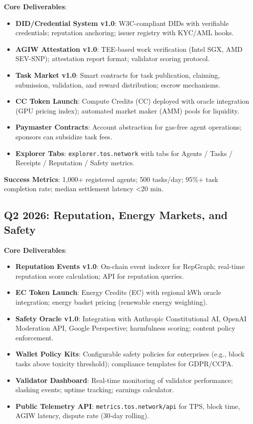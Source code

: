 \documentclass[11pt]{article}
\begin{document}
\textbf{Core Deliverables}:
\begin{itemize}[noitemsep]
  \item \textbf{DID/Credential System v1.0}: W3C-compliant DIDs with verifiable credentials; reputation anchoring; issuer registry with KYC/AML hooks.
  \item \textbf{AGIW Attestation v1.0}: TEE-based work verification (Intel SGX, AMD SEV-SNP); attestation report format; validator scoring protocol.
  \item \textbf{Task Market v1.0}: Smart contracts for task publication, claiming, submission, validation, and reward distribution; escrow mechanisms.
  \item \textbf{CC Token Launch}: Compute Credits (CC) deployed with oracle integration (GPU pricing index); automated market maker (AMM) pools for liquidity.
  \item \textbf{Paymaster Contracts}: Account abstraction for gas-free agent operations; sponsors can subsidize task fees.
  \item \textbf{Explorer Tabs}: \texttt{explorer.tos.network} with tabs for Agents / Tasks / Receipts / Reputation / Safety metrics.
\end{itemize}

\textbf{Success Metrics}: 1,000+ registered agents; 500 tasks/day; 95\%+ task completion rate; median settlement latency <20 min.

\subsection{Q2 2026: Reputation, Energy Markets, and Safety}

\textbf{Core Deliverables}:
\begin{itemize}[noitemsep]
  \item \textbf{Reputation Events v1.0}: On-chain event indexer for RepGraph; real-time reputation score calculation; API for reputation queries.
  \item \textbf{EC Token Launch}: Energy Credits (EC) with regional kWh oracle integration; energy basket pricing (renewable energy weighting).
  \item \textbf{Safety Oracle v1.0}: Integration with Anthropic Constitutional AI, OpenAI Moderation API, Google Perspective; harmfulness scoring; content policy enforcement.
  \item \textbf{Wallet Policy Kits}: Configurable safety policies for enterprises (e.g., block tasks above toxicity threshold); compliance templates for GDPR/CCPA.
  \item \textbf{Validator Dashboard}: Real-time monitoring of validator performance; slashing events; uptime tracking; earnings calculator.
  \item \textbf{Public Telemetry API}: \texttt{metrics.tos.network/api} for TPS, block time, AGIW latency, dispute rate (30-day rolling).
\end{itemize}
\end{document}
